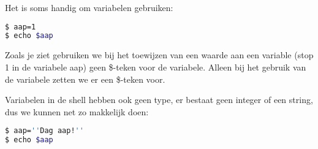 Het is soms handig om variabelen gebruiken:

\begin{lstlisting}[language=bash]
$ aap=1
$ echo $aap
\end{lstlisting}

Zoals je ziet gebruiken we bij het toewijzen van een waarde aan een variable (stop 1 in de variabele aap) geen \$-teken voor de variabele. Alleen bij het gebruik van de variabele zetten we er een \$-teken voor.

Variabelen in de shell hebben ook geen type, er bestaat geen integer of een string, dus we kunnen net zo makkelijk
doen:

\begin{lstlisting}[language=bash]
$ aap=''Dag aap!''
$ echo $aap
\end{lstlisting}
